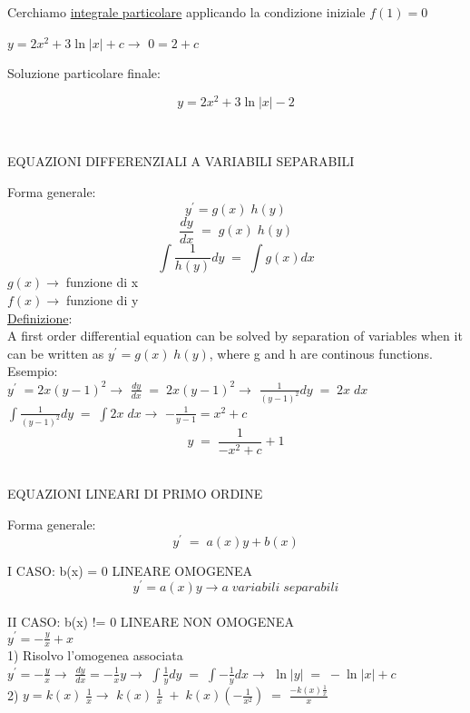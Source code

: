 \documentclass[20pt]{article}
\begin{document}
    Cerchiamo \underline{integrale particolare} applicando la condizione iniziale $f(1)=0$\\
    
    \begin{large}
        $y = 2x^2 + 3 \ln{|x|} + c \rightarrow$
        $ 0 = 2 + c$\\
    \end{large}    
    
    Soluzione particolare finale:
    \begin{large}
        $$y=2x^2 + 3 \ln{|x|} -2 $$
    \end{large}
    \\ [24pt]
    \begin{center}
        EQUAZIONI DIFFERENZIALI A VARIABILI SEPARABILI
    \end{center}
    
    Forma generale:\\
    $$y^{'} = g(x) \; h(y)$$
    $$\frac{dy}{dx} \; = \; g(x) \; h(y)$$
    $$\int{\frac{1}{h(y)} dy} \; = \; \int{g(x)dx}$$
    $g(x) \rightarrow \;$funzione di x\\
    $f(x) \rightarrow \;$funzione di y\\[5pt]
    
    \underline{Definizione}: \\
    A first order differential equation can be solved by separation of variables when it can be written as $y^{'} = g(x) \; h(y)$, where g and h are continous functions.\\
    
    Esempio:\\
    
    $y^{'} \; = 2x (y-1)^2 \rightarrow$
    $\frac{dy}{dx} \; = \; 2x (y-1)^2 \rightarrow$
    $\frac{1}{(y-1)^2}dy \; = \; 2x\;dx$\\
    $\int{\frac{1}{(y-1)^2}} dy \; = \; \int{2x} \; dx \rightarrow$
    $-\frac{1}{y-1} = x^2+c $
    $$y \; = \; \frac{1}{-x^2+c}+1$$
    \\[5pt]

    \begin{center}
        EQUAZIONI LINEARI DI PRIMO ORDINE
    \end{center}
    
    Forma generale: 
    $$y^{'} \; = \; a(x)y+b(x)$$
    
    I CASO: b(x) = 0 LINEARE OMOGENEA
    $$y^{'} = a(x)y \rightarrow a \; variabili \; separabili$$\\
    
    II CASO: b(x) != 0  LINEARE NON OMOGENEA\\[5pt]
    $y^{'} = -\frac{y}{x}+x$\\
    
    1) Risolvo l'omogenea associata\\
    
    $y^{'} = -\frac{y}{x} \rightarrow$
    $ \frac{dy}{dx} = -\frac{1}{x}y \rightarrow $
    $\int{\frac{1}{y}}dy \; = \; \int{-\frac{1}{y} dx \rightarrow}$
    $\ln{|y|} \; = \; -\ln{|x|}+c$\\
    
    2) $y=k(x) \; \frac{1}{x} \rightarrow$
    $k(x) \; \frac{1}{x} \; + \; k(x)(-\frac{1}{x^2}) \; = $
    $\frac{-k(x)\frac{1}{x}}{x}$
    
\end{document}
